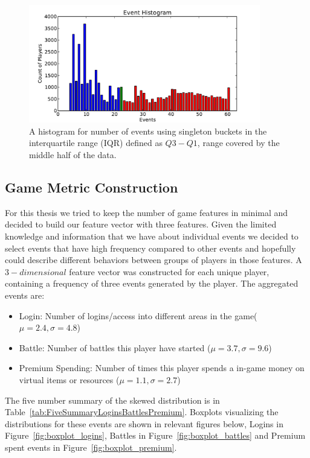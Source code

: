\begin{figure}[here]
\centerline{\includegraphics[width=0.9\textwidth]{Figures/histogram_events_iqr.pdf}}
\caption{A histogram for number of events using singleton buckets in the interquartile range (IQR) defined as $Q3 - Q1$, range covered by the middle half of the data.}
\label{fig:histogram_events_iqr}
\end{figure}


\subsection{Game Metric Construction}
\label{gamemetric}
For this thesis we tried to keep the number of game features in minimal and decided to build our feature vector with three features. Given the limited knowledge and information that we have about individual events we decided to select events that have high frequency compared to other events and hopefully could describe different behaviors between groups of players in those features. A $3-dimensional$ feature vector was constructed for each unique player, containing a frequency of three events generated by the player. The aggregated events are:
\begin{itemize}
\item Login: Number of logins/access into different areas in the game($\mu = 2.4, \sigma = 4.8$)
\item Battle: Number of battles this player have started ($\mu = 3.7, \sigma = 9.6$)
\item Premium Spending: Number of times this player spends a in-game money on virtual items or resources ($\mu = 1.1, \sigma = 2.7$) 
\end{itemize}

The five number summary of the skewed distribution is in Table~\ref{tab:FiveSummaryLoginsBattlesPremium}. Boxplots visualizing the distributions for these events are shown in relevant figures below, Logins in Figure~\ref{fig:boxplot_logins}, Battles in Figure~\ref{fig:boxplot_battles} and Premium spent events in Figure~\ref{fig:boxplot_premium}.


